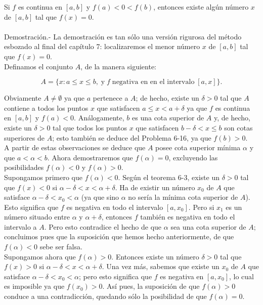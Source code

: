 \setcounter{chapter}{7}
\setcounter{teo}{0}
\begin{teo}
    Si $f$ es continua en $[a,b]$ y $f(a)<0<f(b)$, entonces existe algún número $x$ de $[a,b]$ tal que $f(x)=0.$\\\\
	Demostración.-\; La demostración es tan sólo una versión rigurosa del método esbozado al final del capítulo 7: localizaremos el menor número $x$ de $[a,b]$ tal que $f(x)=0$.\\
	Definamos el conjunto $A$, de la manera siguiente:

	$$A=\lbrace x:a\leq x \leq b, \; \mbox{y}\; f \; \mbox{negativa en en el intervalo}\; [a,x]\rbrace.$$

	Obviamente $A\neq \emptyset$ ya que $a$ pertenece a $A$; de hecho, existe un $\delta >0$  tal que $A$ contiene a todos los puntos $x$ que satisfacen $a\leq x < a+\delta$ ya que $f$ es continua en $[a,b]$ y $f(a)<0$. Análogamente, $b$ es una cota superior de $A$ y, de hecho, existe un $\delta>0$ tal que todos los puntos $x$ que satisfacen $b-\delta<x\leq b$ son cotas superiores de $A$; esto también se deduce del Problema 6-16, ya que $f(b)>0$.\\
	A partir de estas observaciones se deduce que $A$ posee cota superior mínima $\alpha$ y que $a<\alpha<b$. Ahora demostraremos que $f(\alpha)=0$, excluyendo las posibilidades $f(\alpha)<0$ y $f(\alpha)>0$.\\
	Supongamos primero que $f(\alpha)<0$. Según el teorema 6-3, existe un $\delta>0$ tal que $f(x)<0$ si $\alpha- \delta<x<\alpha+\delta$. Ha de existir un número $x_0$ de $A$ que satisface $\alpha-\delta<x_0<\alpha$ (ya que sino $\alpha$ no sería la mínima cota superior de $A$). Esto significa que $f$ es negativa en todo el intervalo $[a,x_0]$. Pero si $x_1$ es un número situado entre $\alpha$ y $\alpha+\delta$, entonces $f$ también es negativa en todo el intervalo a $A$. Pero esto contradice el hecho de que $\alpha$ sea una cota superior de $A$; concluimos pues que la suposición que hemos hecho anteriormente, de que $f(\alpha)<0$ sebe ser falsa.\\
	Supongamos ahora que $f(\alpha)>0$. Entonces existe un número $\delta>0$ tal que $f(x)>0$ si $\alpha-\delta<x<\alpha+\delta$. Una vez más, sabemos que existe un $x_0$ de $A$ que satisface $\alpha-\delta<x_0<\alpha$; pero esto significa que $f$ es negativa en $[a,x_0]$, lo cual es imposible ya que $f(x_0)>0$. Así pues, la suposición de que $f(\alpha)>0$ conduce a una contradicción, quedando sólo la posibilidad de que $f(\alpha)=0$.\\
\end{teo}

